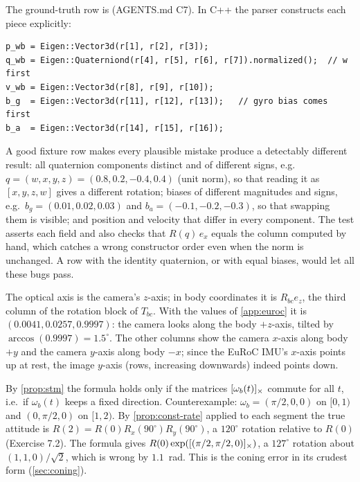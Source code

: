 \begin{solutions}
  \item The ground-truth row is  (AGENTS.md C7).
        In C++ the parser constructs each piece explicitly:
\begin{lstlisting}
p_wb = Eigen::Vector3d(r[1], r[2], r[3]);
q_wb = Eigen::Quaterniond(r[4], r[5], r[6], r[7]).normalized();  // w first
v_wb = Eigen::Vector3d(r[8], r[9], r[10]);
b_g  = Eigen::Vector3d(r[11], r[12], r[13]);   // gyro bias comes first
b_a  = Eigen::Vector3d(r[14], r[15], r[16]);
\end{lstlisting}
        A good fixture row makes every plausible mistake produce a detectably different result: all quaternion components distinct and of
        different signs, e.g.\ $q = (w, x, y, z) = (0.8, 0.2, -0.4, 0.4)$ (unit norm), so that reading it as $[x, y, z, w]$ gives a different rotation;
        biases of different magnitudes and signs, e.g.\ $b_g = (0.01, 0.02, 0.03)$ and $b_a = (-0.1, -0.2, -0.3)$, so that swapping them is visible;
        and position and velocity that differ in every component. The test asserts each field and also checks that $R(q)\,e_x$ equals the column
        computed by hand, which catches a wrong constructor order even when the norm is unchanged. A row with the identity quaternion, or with
        equal biases, would let all these bugs pass.

  \item The optical axis is the camera's $z$-axis; in body coordinates it is $R_{bc}e_z$, the third column of the rotation block of $T_{bc}$. With the
        values of \cref{app:euroc} it is $(0.0041, 0.0257, 0.9997)$: the camera looks along the body $+z$-axis, tilted by $\arccos(0.9997) = 1.5^\circ$. The
        other columns show the camera $x$-axis along body $+y$ and the camera $y$-axis along body $-x$; since the EuRoC IMU's $x$-axis points up at
        rest, the image $y$-axis (rows, increasing downwards) indeed points down.

  \item By \cref{prop:stm} the formula holds only if the matrices $[\omega_b(t)]_{\times}$ commute for all $t$, i.e.\ if $\omega_b(t)$ keeps a fixed direction. Counterexample:
        $\omega_b = (\pi/2, 0, 0)$ on $[0, 1)$ and $(0, \pi/2, 0)$ on $[1, 2)$. By \cref{prop:const-rate} applied to each segment the true attitude is
        $R(2) = R(0)R_x(90^\circ)R_y(90^\circ)$, a $120^\circ$ rotation relative to $R(0)$ (Exercise 7.2). The formula gives
        $R(0)\exp([(\pi/2, \pi/2, 0)]_{\times})$, a $127^\circ$ rotation about $(1, 1, 0)/\sqrt2$, which is wrong by $1.1$~rad. This is the coning error in its
        crudest form (\cref{sec:coning}).


\end{solutions}
